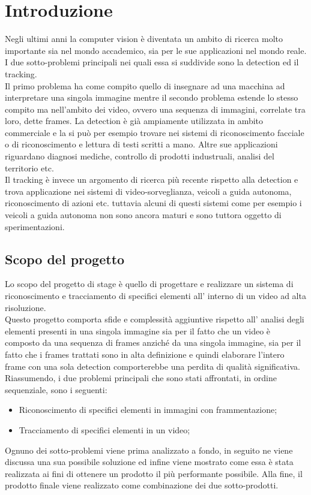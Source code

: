 \section{Introduzione}
Negli ultimi anni la computer vision è diventata un ambito di ricerca molto importante sia nel mondo accademico, sia per le sue applicazioni nel mondo reale. I due sotto-problemi principali nei quali essa si suddivide sono la detection ed il tracking.\\
Il primo problema ha come compito quello di insegnare ad una macchina ad interpretare una singola immagine mentre il secondo problema estende lo stesso compito ma nell'ambito dei video, ovvero una sequenza di immagini, correlate tra loro, dette frames. La detection è già ampiamente utilizzata in ambito commerciale e la si può per esempio trovare nei sistemi di riconoscimento facciale o di riconoscimento e lettura di testi scritti a mano. Altre sue applicazioni riguardano diagnosi mediche, controllo di prodotti industruali, analisi del territorio etc.\\ 
Il tracking è invece un argomento di ricerca più recente rispetto alla detection e trova applicazione nei sistemi di video-sorveglianza, veicoli a guida autonoma, riconoscimento di azioni etc. tuttavia alcuni di questi sistemi come per esempio i veicoli a guida autonoma non sono ancora maturi e sono tuttora oggetto di sperimentazioni.
\subsection{Scopo del progetto}
Lo scopo del progetto di stage è quello di progettare e realizzare un sistema di riconoscimento e tracciamento di specifici elementi all' interno di un video ad alta risoluzione.\\
Questo progetto comporta sfide e complessità aggiuntive rispetto all' analisi degli elementi presenti in una singola immagine sia per il fatto che un video è composto da una sequenza di frames anziché da una singola immagine, sia per il fatto che i frames trattati sono in alta definizione e quindi elaborare l'intero frame con una sola detection comporterebbe una perdita di qualità significativa.\\
Riassumendo, i due problemi principali che sono stati affrontati, in ordine sequenziale, sono i seguenti:
\begin{itemize}
\item Riconoscimento di specifici elementi in immagini con frammentazione;
\item Tracciamento di specifici elementi in un video;
\end{itemize}
Ognuno dei sotto-problemi viene prima analizzato a fondo, in seguito ne viene discussa una sua possibile soluzione ed infine viene mostrato come essa è stata realizzata ai fini di ottenere un prodotto il più performante possibile.
Alla fine, il prodotto finale viene realizzato come combinazione dei due sotto-prodotti.

